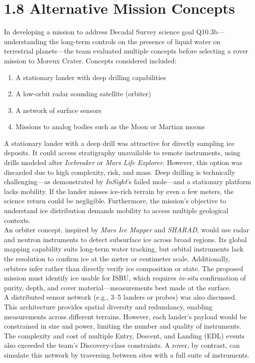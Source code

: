\section*{1.8 Alternative Mission Concepts}

In developing a mission to address Decadal Survey science goal Q10.3b—understanding the long-term controls on the presence of liquid water on terrestrial planets—the team evaluated multiple concepts before selecting a rover mission to Moreux Crater. Concepts considered included: 
\begin{enumerate}
    \item A stationary lander with deep drilling capabilities
    \item A low-orbit radar sounding satellite (orbiter)
    \item A network of surface sensors
    \item Missions to analog bodies such as the Moon or Martian moons
\end{enumerate}

A stationary lander with a deep drill was attractive for directly sampling ice deposits. It could access stratigraphy unavailable to remote instruments, using drills modeled after \textit{Icebreaker} or \textit{Mars Life Explorer}. However, this option was discarded due to high complexity, risk, and mass. Deep drilling is technically challenging—as demonstrated by \textit{InSight}’s failed mole—and a stationary platform lacks mobility. If the lander misses ice-rich terrain by even a few meters, the science return could be negligible. Furthermore, the mission’s objective to understand ice distribution demands mobility to access multiple geological contexts.\\

An orbiter concept, inspired by \textit{Mars Ice Mapper} and \textit{SHARAD}, would use radar and neutron instruments to detect subsurface ice across broad regions. Its global mapping capability suits long-term water tracking, but orbital instruments lack the resolution to confirm ice at the meter or centimeter scale. Additionally, orbiters infer rather than directly verify ice composition or state. The proposed mission must identify ice usable for ISRU, which requires \textit{in-situ} confirmation of purity, depth, and cover material—measurements best made at the surface.\\

A distributed sensor network (e.g., 3–5 landers or probes) was also discussed. This architecture provides spatial diversity and redundancy, enabling measurements across different terrains. However, each lander’s payload would be constrained in size and power, limiting the number and quality of instruments. The complexity and cost of multiple Entry, Descent, and Landing (EDL) events also exceeded the team’s Discovery-class constraints. A rover, by contrast, can simulate this network by traversing between sites with a full suite of instruments.\\

